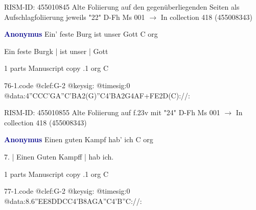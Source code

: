 \documentclass[twocolumn]{book}
\begin{document}
\newline RISM-ID: 455010845
\newline Alte Foliierung auf den gegenüberliegenden Seiten als Aufschlagfoliierung jeweils "22"
\newline D-Fh  Ms 001
\newline $\rightarrow$ In collection 418 (455008343)

\newline \par \vspace{7pt} \textcolor{darkblue}{\textbf{Anonymus  }}
\newline Ein' feste Burg ist unser Gott  C  
\newline org
\newline \begin{itshape}[f.24r, at left:] Ein feste Burgk | ist unser | Gott\end{itshape} 
\newline \textcolor{darkblue}{}  1 parts  
\newline Manuscript copy
.1  org  C  
\begin{filecontents*}{76-1.code}
@clef:G-2
@keysig:
@timesig:0
@data:4''CCC'GA''C'BA2(G)''C4'BA2G4AF+FE2D(C)://:
\end{filecontents*}
\newline
%

\newline RISM-ID: 455010855
\newline Alte Foliierung auf f.23v mit "24"
\newline D-Fh  Ms 001
\newline $\rightarrow$ In collection 418 (455008343)

\newline \par \vspace{7pt} \textcolor{darkblue}{\textbf{Anonymus  }}
\newline Einen guten Kampf hab' ich  C  
\newline org
\newline \begin{itshape}[f.6r, at left:] 7. | Einen Guten Kampff | hab ich.\end{itshape} 
\newline \textcolor{darkblue}{}  1 parts  
\newline Manuscript copy
.1  org  C  
\begin{filecontents*}{77-1.code}
@clef:G-2
@keysig:
@timesig:0
@data:8.6''EE{8DD}{CC}4'B{8AGA''C}4'B''C://:
\end{filecontents*}
\newline
%
\end{document}
